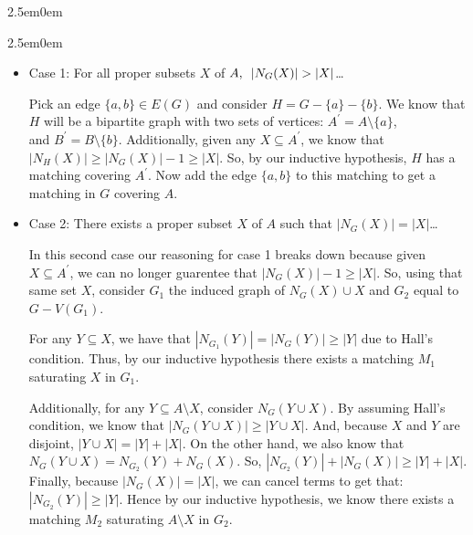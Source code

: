 \documentclass{book}
\newcommand{\hFour}{%
   \color{Cerulean}
   \fontsize{12}{14}\selectfont%
}
\newenvironment{myIndent}{%
   \begin{adjustwidth}{2.5em}{0em}%
}{%
   \end{adjustwidth}%
}
\newcommand{\retTwo}{\hfill\bigbreak}
\begin{document}
{\begin{myIndent}
{\begin{myIndent}
      \begin{itemize}
         \item Case 1: For all proper subsets $X$ of $A, \hspace{0.5em}\lvert N_G(X) \rvert > \lvert X \rvert$\dots\\ {\hFour
            Pick an edge $\{a, b\} \in E(G)$ and consider $H = G - \{a\} - \{b\}$. We know that $H$ will be a bipartite graph with two sets of vertices: $A^\prime = A \setminus \{a\}$,\\ and $B^\prime = B \setminus \{b\}$. Additionally, given any $X \subseteq A^\prime$, we know that\\ $\lvert N_H(X) \rvert \geq \lvert N_G(X) \rvert - 1 \geq \lvert X \rvert$. So, by our inductive hypothesis, $H$ has a matching covering $A^\prime$. Now add the edge $\{a, b\}$ to this matching to get a matching in $G$ covering $A$.
         } 
         \retTwo

         \item Case 2: There exists a proper subset $X$ of $A$ such that $\left|N_G(X)\right| = \left| X \right|$\dots\\ {\hFour
            In this second case our reasoning for case 1 breaks down because given $X \subseteq A^\prime$, we can no longer guarentee that $\lvert N_G(X) \rvert - 1 \geq \lvert X \rvert$. So, using that same set $X$,  consider $G_1$ the induced graph of $N_G(X) \cup X$ and $G_2$ equal to $G - V(G_1)$. \retTwo

            For any $Y \subseteq X$, we have that $\left| N_{G_1}(Y) \right| = \left| N_G(Y) \right| \geq \left| Y \right|$ due to Hall's\\ condition. Thus, by our inductive hypothesis there exists a matching $M_1$ saturating $X$ in $G_1$. \retTwo

            Additionally, for any $Y \subseteq A \setminus X$, consider $N_G(Y \cup X)$. By assuming Hall's condition, we know that $\lvert N_G(Y \cup X) \rvert \geq \left| Y \cup X \right|$. And, because $X$ and $Y$ are disjoint, $\left| Y \cup X \right| = \left| Y \right| + \left| X \right|$. On the other hand, we also know that $N_G(Y \cup X) = N_{G_2}(Y) + N_G(X)$. So, $\left|N_{G_2}(Y)\right| + \left| N_G(X) \right| \geq \left| Y \right| + \left| X \right|$. Finally, because $\left|N_G(X)\right| = \left| X \right|$, we can cancel terms to get that:\\ $\left| N_{G_2}(Y) \right| \geq \left| Y \right|$. Hence by our inductive hypothesis, we know there exists a matching $M_2$ saturating $A \setminus X$ in $G_2$. \retTwo

}
\end{itemize}
\end{myIndent}}
\end{myIndent}}
\end{document}
